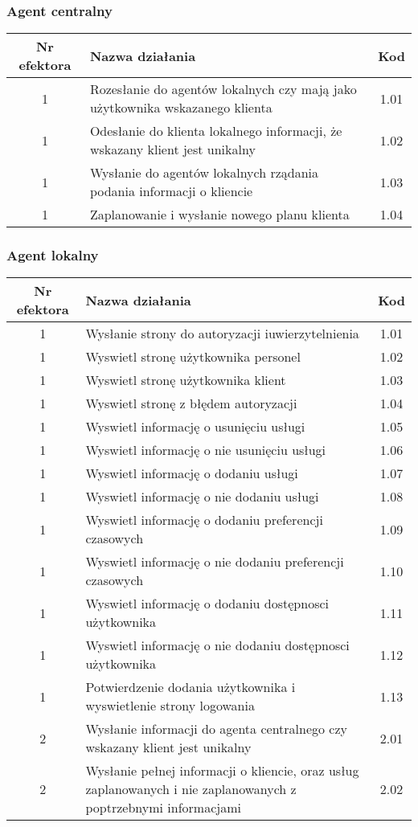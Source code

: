 \subsubsection{Agent centralny}

\begin{tabular}{c|p{5cm}|c}
Nr efektora & Nazwa działania & Kod\\
\hline
1 & Rozesłanie do agentów lokalnych czy mają jako użytkownika wskazanego klienta & 1.01\\
1 & Odesłanie do klienta lokalnego informacji, że wskazany klient jest unikalny & 1.02\\
1 & Wysłanie do agentów lokalnych rządania podania informacji o kliencie & 1.03\\
1 & Zaplanowanie i wysłanie nowego planu klienta & 1.04\\
\end{tabular}

\subsubsection{Agent lokalny}

\begin{tabular}{c|p{5cm}|c}
Nr efektora & Nazwa działania & Kod\\
\hline
1 & Wysłanie strony do autoryzacji iuwierzytelnienia & 1.01\\
1 & Wyswietl stronę użytkownika personel & 1.02\\
1 & Wyswietl stronę użytkownika klient & 1.03\\
1 & Wyswietl stronę z błędem autoryzacji & 1.04\\
1 & Wyswietl informację o usunięciu usługi & 1.05\\
1 & Wyswietl informację o nie usunięciu usługi & 1.06\\
1 & Wyswietl informację o dodaniu usługi & 1.07\\
1 & Wyswietl informację o nie dodaniu usługi & 1.08\\
1 & Wyswietl informację o dodaniu preferencji czasowych & 1.09\\
1 & Wyswietl informację o nie dodaniu preferencji czasowych & 1.10\\
1 & Wyswietl informację o dodaniu dostępnosci użytkownika & 1.11\\
1 & Wyswietl informację o nie dodaniu dostępnosci użytkownika & 1.12\\
1 & Potwierdzenie dodania użytkownika i wyswietlenie strony logowania & 1.13\\
\hline
2 & Wysłanie informacji do agenta centralnego czy wskazany klient jest unikalny & 2.01\\
2 & Wysłanie pełnej informacji o kliencie, oraz usług zaplanowanych i nie zaplanowanych z poptrzebnymi informacjami & 2.02\\
\end{tabular}

